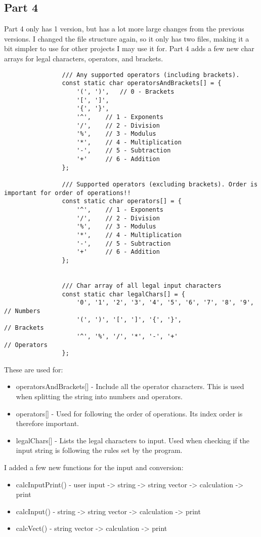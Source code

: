 \documentclass{article}
\begin{document}
		
		\subsection{Part 4}
			Part 4 only has 1 version, but has a lot more large changes from the previous versions. I changed the file structure again, so it only has two files, making it a bit simpler to use for other projects I may use it for.
			Part 4 adds a few new char arrays for legal characters, operators, and brackets.
			\begin{lstlisting}
				/// Any supported operators (including brackets).
				const static char operatorsAndBrackets[] = {
					'(', ')',   // 0 - Brackets
					'[', ']',
					'{', '}',
					'^',    // 1 - Exponents
					'/',    // 2 - Division
					'%',    // 3 - Modulus
					'*',    // 4 - Multiplication
					'-',    // 5 - Subtraction
					'+'     // 6 - Addition
				};
				
				/// Supported operators (excluding brackets). Order is important for order of operations!!
				const static char operators[] = {
					'^',    // 1 - Exponents
					'/',    // 2 - Division
					'%',    // 3 - Modulus
					'*',    // 4 - Multiplication
					'-',    // 5 - Subtraction
					'+'     // 6 - Addition
				};
				
				
				/// Char array of all legal input characters
				const static char legalChars[] = {
					'0', '1', '2', '3', '4', '5', '6', '7', '8', '9',   // Numbers
					'(', ')', '[', ']', '{', '}',                       // Brackets
					'^', '%', '/', '*', '-', '+'                        // Operators
				};
			\end{lstlisting}
			
			These are used for:
			\begin{itemize}
				\item operatorsAndBrackets[] 	- Include all the operator characters. This is used when splitting the string into numbers and operators.
				\item operators[]				- Used for following the order of operations. Its index order is therefore important.
				\item legalChars[]				- Lists the legal characters to input. Used when checking if the input string is following the rules set by the program.
			\end{itemize}
			
			I added a few new functions for the input and conversion:
			\begin{itemize}
				\item calcInputPrint()	- user input -> string -> string vector -> calculation -> print
				\item calcInput()		- string -> string vector -> calculation -> print
				\item calcVect()		- string vector -> calculation -> print
			\end{itemize}
			
\end{document}
